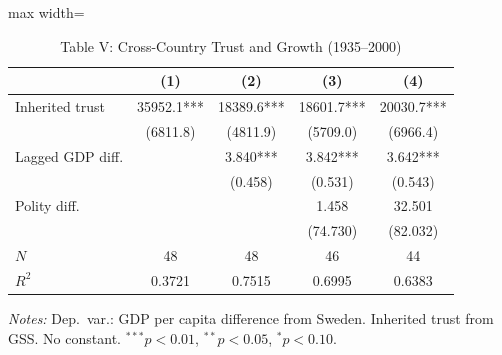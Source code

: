 \begin{table}[htbp]
\centering
\caption{Table V: Cross-Country Trust and Growth (1935--2000)}
\label{tab:algan_table5}
\begin{adjustbox}{max width=\textwidth}
\begin{tabular}{lcccc}
\toprule
 & (1) & (2) & (3) & (4) \\
\midrule
Inherited trust & 35952.1*** & 18389.6*** & 18601.7*** & 20030.7*** \\
 & (6811.8) & (4811.9) & (5709.0) & (6966.4) \\
Lagged GDP diff. &  & 3.840*** & 3.842*** & 3.642*** \\
 &  & (0.458) & (0.531) & (0.543) \\
Polity diff. &  &  & 1.458 & 32.501 \\
 &  &  & (74.730) & (82.032) \\
\midrule
$N$ & 48 & 48 & 46 & 44 \\
$R^2$ & 0.3721 & 0.7515 & 0.6995 & 0.6383 \\
\bottomrule
\end{tabular}
\end{adjustbox}
\parbox{\textwidth}{\footnotesize\textit{Notes:} Dep.\ var.: GDP per capita difference from Sweden. Inherited trust from GSS. No constant. $^{***}p<0.01$, $^{**}p<0.05$, $^{*}p<0.10$.}
\end{table}